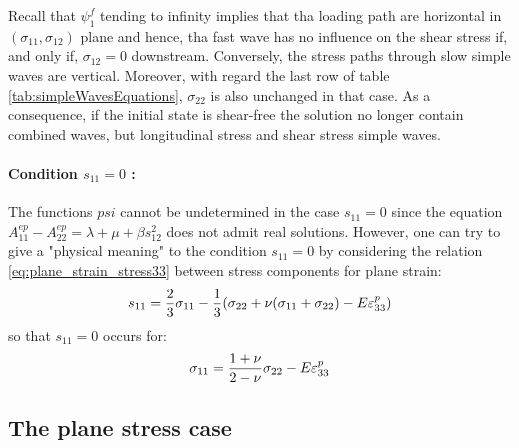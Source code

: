 Recall that $\psi^f_1$ tending to infinity implies that tha loading path are horizontal in $(\sigma_{11},\sigma_{12})$ plane and hence, tha fast wave has no influence on the shear stress if, and only if, $\sigma_{12}=0$ downstream. Conversely, the stress paths through slow simple waves are vertical. Moreover, with regard the last row of table \ref{tab:simpleWavesEquations}, $\sigma_{22}$ is also unchanged in that case. As a consequence, if the initial state is shear-free the solution no longer contain combined waves, but longitudinal stress and shear stress simple waves.

\paragraph*{Condition $s_{11}=0$ :} The functions $psi$ cannot be undetermined in the case $s_{11}=0$ since the equation $A_{11}^{ep}-A_{22}^{ep}=\lambda + \mu + \beta s_{12}^2$ does not admit real solutions.
However, one can try to give a "physical meaning" to the condition $s_{11}=0$ by considering the relation \eqref{eq:plane_strain_stress33} between stress components for plane strain:
\begin{equation*}
  s_{11}= \frac{2}{3}\sigma_{11}-\frac{1}{3}(\sigma_{22}+\nu(\sigma_{11}+\sigma_{22})-E\varepsilon^p_{33})
\end{equation*}
so that $s_{11}=0$ occurs for:
\begin{equation}
  \label{eq:plane_strain_s11=0}
  \sigma_{11}=\frac{1+\nu}{2-\nu}\sigma_{22}-E\varepsilon^p_{33}
\end{equation}


\subsection{The plane stress case}






